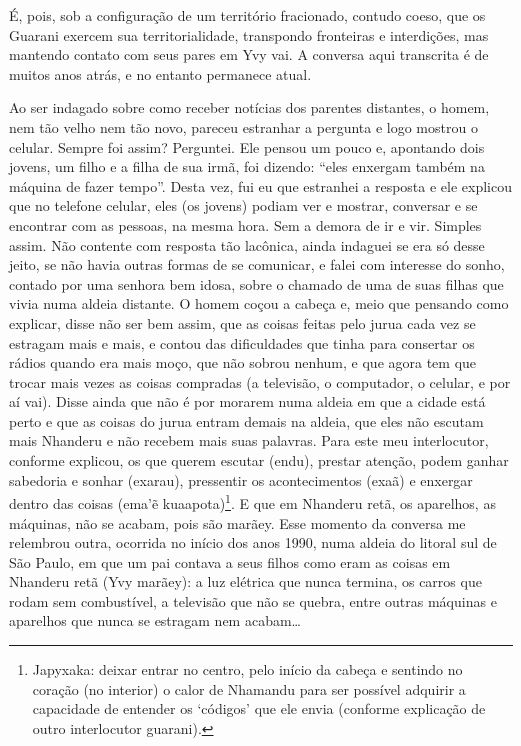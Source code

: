 É, pois, sob a configuração de um território fracionado, contudo coeso,
que os Guarani exercem sua territorialidade, transpondo fronteiras e
interdições, mas mantendo contato com seus pares em Yvy vai. A conversa
aqui transcrita é de muitos anos atrás, e no entanto permanece atual. 

Ao ser indagado sobre como receber notícias dos parentes distantes, o
homem, nem tão velho nem tão novo, pareceu estranhar a pergunta e logo
mostrou o celular. Sempre foi assim? Perguntei. Ele pensou um pouco e,
apontando dois jovens, um filho e a filha de sua irmã, foi dizendo:
``eles enxergam também na máquina de fazer tempo''. Desta vez, fui eu que
estranhei a resposta e ele explicou que no telefone celular, eles (os
jovens) podiam ver e mostrar, conversar e se encontrar com as pessoas,
na mesma hora. Sem a demora de ir e vir. Simples assim. Não contente
com resposta tão lacônica, ainda indaguei se era só desse jeito, se não
havia outras formas de se comunicar, e falei com interesse do sonho,
contado por uma senhora bem idosa, sobre o chamado de uma de suas
filhas que vivia numa aldeia distante. O homem coçou a cabeça e, meio
que pensando como explicar, disse não ser bem assim, que as coisas
feitas pelo jurua cada vez se estragam mais e mais, e contou das
dificuldades que tinha para consertar os rádios quando era mais moço,
que não sobrou nenhum, e que agora tem que trocar mais vezes as coisas
compradas (a televisão, o computador, o celular, e por aí vai). Disse
ainda que não é por morarem numa aldeia em que a cidade está perto e
que as coisas do jurua entram demais na aldeia, que eles não escutam
mais Nhanderu e não recebem mais suas palavras. Para este meu
interlocutor, conforme explicou, os que querem escutar (endu), prestar
atenção, podem ganhar sabedoria e sonhar (exarau), pressentir os
acontecimentos (exaã) e enxergar dentro das coisas (ema'ẽ
kuaapota)\footnote{Japyxaka: deixar entrar no centro, pelo início da
cabeça e sentindo no coração (no interior) o calor de Nhamandu para ser
possível adquirir a capacidade de entender os ‘códigos’ que ele envia
(conforme explicação de outro interlocutor guarani).}. E que em
Nhanderu retã, os aparelhos, as máquinas, não se acabam, pois são
marãey. Esse momento da conversa me relembrou outra, ocorrida no início
dos anos 1990, numa aldeia do litoral sul de São Paulo, em que um pai
contava a seus filhos como eram as coisas em Nhanderu retã (Yvy
marãey): a luz elétrica que nunca termina, os carros que rodam sem
combustível, a televisão que não se quebra, entre outras máquinas e
aparelhos que nunca se estragam nem acabam\ldots{} 

